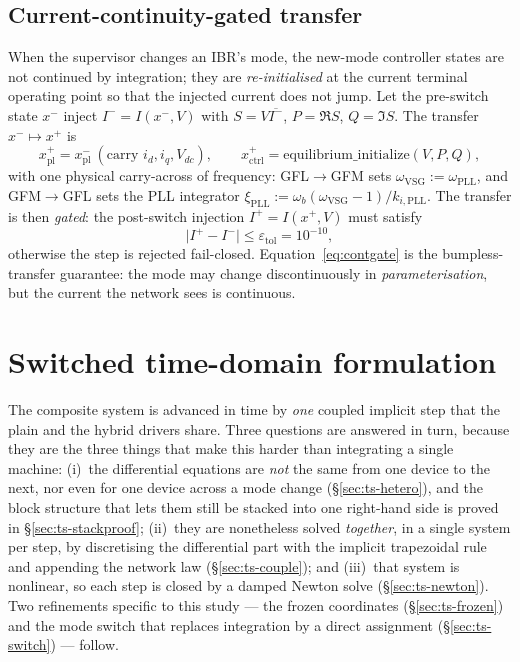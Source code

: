 \documentclass[12pt,a4paper]{article}
\theoremstyle{remark}
\begin{document}
\subsection{Current-continuity-gated transfer}\label{sec:transfer}
When the supervisor changes an IBR's mode, the new-mode controller states are not
continued by integration; they are \emph{re-initialised} at the current terminal
operating point so that the injected current does not jump. Let the pre-switch
state $x^{-}$ inject $I^{-}=I(x^{-},V)$ with $S=V\overline{I^{-}}$,
$P=\Re S$, $Q=\Im S$. The transfer $x^{-}\mapsto x^{+}$ is
\begin{equation}
  x^{+}_{\mathrm{pl}}=x^{-}_{\mathrm{pl}}\ (\text{carry }i_d,i_q,V_{dc}),\qquad
  x^{+}_{\mathrm{ctrl}}=\text{equilibrium\_initialize}(V,P,Q),
  \label{eq:transfer}
\end{equation}
with one physical carry-across of frequency: GFL$\to$GFM sets
$\omega_{\mathrm{VSG}}\!:=\!\omega_{\mathrm{PLL}}$, and GFM$\to$GFL sets the PLL
integrator $\xi_{\mathrm{PLL}}\!:=\!\omega_b(\omega_{\mathrm{VSG}}-1)/k_{i,\mathrm{PLL}}$.
The transfer is then \emph{gated}: the post-switch injection $I^{+}=I(x^{+},V)$
must satisfy
\begin{equation}
  \bigl|I^{+}-I^{-}\bigr|\le\varepsilon_{\mathrm{tol}}=10^{-10},
  \label{eq:contgate}
\end{equation}
otherwise the step is rejected fail-closed. Equation~\eqref{eq:contgate} is the
bumpless-transfer guarantee: the mode may change discontinuously in
\emph{parameterisation}, but the current the network sees is continuous.

\section{Switched time-domain formulation}\label{sec:ts}
The composite system is advanced in time by \emph{one} coupled implicit step
that the plain and the hybrid drivers share. Three questions are answered in
turn, because they are the three things that make this harder than integrating a
single machine: (i)~the differential equations are \emph{not} the same from one
device to the next, nor even for one device across a mode change
(\S\ref{sec:ts-hetero}), and the block structure that lets them still be stacked
into one right-hand side is proved in \S\ref{sec:ts-stackproof};
(ii)~they are nonetheless solved \emph{together}, in a single system per step, by
discretising the differential part with the implicit trapezoidal rule and
appending the network law (\S\ref{sec:ts-couple}); and
(iii)~that system is nonlinear, so each step is closed by a damped Newton solve
(\S\ref{sec:ts-newton}). Two refinements specific to this study --- the frozen
coordinates (\S\ref{sec:ts-frozen}) and the mode switch that replaces
integration by a direct assignment (\S\ref{sec:ts-switch}) --- follow.
\end{document}
